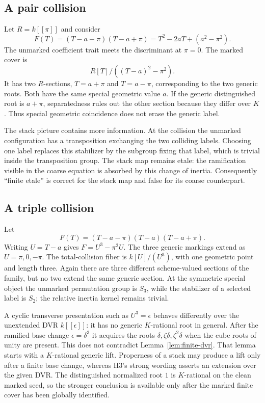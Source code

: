\documentclass[11pt]{article}
\begin{document}
\subsection{A pair collision}

Let $R=k[[\pi]]$ and consider
\[
 F(T)=(T-a-\pi)(T-a+\pi)
     =T^2-2aT+(a^2-\pi^2).
\]
The unmarked coefficient trait meets the discriminant at $\pi=0$.  The
marked cover is
\[
 R[T]/((T-a)^2-\pi^2).
\]
It has two $R$-sections, $T=a+\pi$ and $T=a-\pi$, corresponding to the two
generic roots.  Both have the same special geometric value $a$.  If the
generic distinguished root is $a+\pi$, separatedness rules out the other
section because they differ over $K$.  Thus special geometric coincidence
does not erase the generic label.

The stack picture contains more information.  At the collision the
unmarked configuration has a transposition exchanging the two colliding
labels.  Choosing one label replaces this stabilizer by the subgroup fixing
that label, which is trivial inside the transposition group.  The stack map
remains etale: the ramification visible in the coarse equation is absorbed
by this change of inertia.  Consequently ``finite etale'' is correct for the
stack map and false for its coarse counterpart.

\subsection{A triple collision}

Let
\[
 F(T)=(T-a-\pi)(T-a)(T-a+\pi).
\]
Writing $U=T-a$ gives $F=U^3-\pi^2U$.  The three generic markings extend as
$U=\pi,0,-\pi$.  The total-collision fiber is $k[U]/(U^3)$, with one
geometric point and length three.  Again there are three different
scheme-valued sections of the family, but no two extend the same generic
section.  At the symmetric special object the unmarked permutation group is
$S_3$, while the stabilizer of a selected label is $S_2$; the relative
inertia kernel remains trivial.

A cyclic transverse presentation such as $U^3=\epsilon$ behaves differently
over the unextended DVR $k[[\epsilon]]$: it has no generic $K$-rational root
in general.  After the ramified base change $\epsilon=\delta^3$ it acquires
the roots $\delta,\zeta\delta,\zeta^2\delta$ when the cube roots of unity are
present.  This does not contradict Lemma~\ref{lem:finite-dvr}.  That lemma
starts with a $K$-rational generic lift.  Properness of a stack may produce a
lift only after a finite base change, whereas H3's strong wording asserts an
extension over the given DVR.  The distinguished normalized root $1$ is
$K$-rational on the clean marked seed, so the stronger conclusion is
available only after the marked finite cover has been globally identified.
\end{document}
